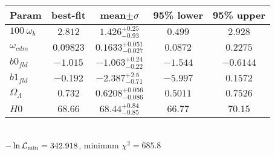 \begin{tabular}{|l|c|c|c|c|} 
 \hline 
Param & best-fit & mean$\pm\sigma$ & 95\% lower & 95\% upper \\ \hline 
$100~\omega_{b }$ &$2.812$ & $1.426_{-0.93}^{+0.25}$ & $0.499$ & $2.928$ \\ 
$\omega_{cdm }$ &$0.09823$ & $0.1633_{-0.027}^{+0.051}$ & $0.0872$ & $0.2275$ \\ 
$b0_{fld }$ &$-1.015$ & $-1.063_{-0.22}^{+0.24}$ & $-1.544$ & $-0.6144$ \\ 
$b1_{fld }$ &$-0.192$ & $-2.387_{-0.71}^{+2.5}$ & $-5.997$ & $0.1572$ \\ 
$\Omega_{\Lambda }$ &$0.732$ & $0.6208_{-0.086}^{+0.056}$ & $0.5011$ & $0.7526$ \\ 
$H0$ &$68.66$ & $68.44_{-0.85}^{+0.84}$ & $66.77$ & $70.15$ \\ 
\hline 
 \end{tabular} \\ 
$-\ln{\cal L}_\mathrm{min} =342.918$, minimum $\chi^2=685.8$ \\ 
